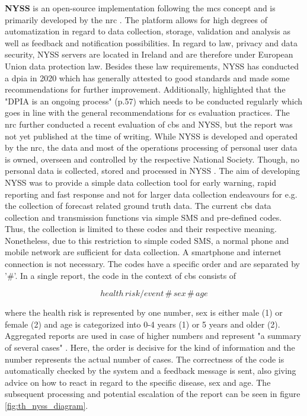 \textbf{NYSS} is an open-source implementation following the \acrshort{mcs} concept and is primarily developed by the \acrshort{nrc} \autocite{jungCommunityBasedSurveillance2022}. The platform allows for high degrees of automatization in regard to data collection, storage, validation and analysis as well as feedback and notification possibilities.\newline
In regard to law, privacy and data security, NYSS servers are located in Ireland and are therefore under European Union data protection law. Besides these law requirements, NYSS has conducted a \acrfull{dpia} in 2020 \autocite{quinnNyssDATAPROTECTION2020} which has generally attested to good standards and made some recommendations for further improvement. Additionally, \autocite{quinnNyssDATAPROTECTION2020} highlighted that the "DPIA is an ongoing process" (p.57) which needs to be conducted regularly which goes in line with the general recommendations for \acrshort{cs} evaluation practices. The \acrshort{nrc} further conducted a recent evaluation of \acrshort{cbs} and NYSS, but the report was not yet published at the time of writing.\newline
While NYSS is developed and operated by the \acrshort{nrc}, the data and most of the operations processing of personal user data is owned, overseen and controlled by the respective National Society. Though, no personal data is collected, stored and processed in NYSS \autocite{nrcNYSSCommunitybasedSurveillance2021}.\newline
The aim of developing NYSS was to provide a simple data collection tool for early warning, rapid reporting and fast response and not for larger data collection endeavours for e.g. the collection of forecast related ground truth data. The current \acrshort{cbs} data collection and transmission functions via simple SMS and pre-defined codes. Thus, the collection is limited to these codes and their respective meaning. Nonetheless, due to this restriction to simple coded SMS, a normal phone and mobile network are sufficient for data collection. A smartphone and internet connection is not necessary. The codes have a specific order and are separated by '\#'. In a single report, the code in the context of \acrshort{cbs} consists of 

    \[health\, risk/event\, \#\, sex\, \#\, age\] %

where the health risk is represented by one number, sex is either male (1) or female (2) and age is categorized into 0-4 years (1) or 5 years and older (2). Aggregated reports are used in case of higher numbers and represent "a summary of several cases" \autocite[35]{nrcNYSSCommunitybasedSurveillance2021}. Here, the order is decisive for the kind of information and the number represents the actual number of cases. The correctness of the code is automatically checked by the system and a feedback message is sent, also giving advice on how to react in regard to the specific disease, sex and age. The subsequent processing and potential escalation of the report can be seen in figure \ref{fig:th_nyss_diagram}.


